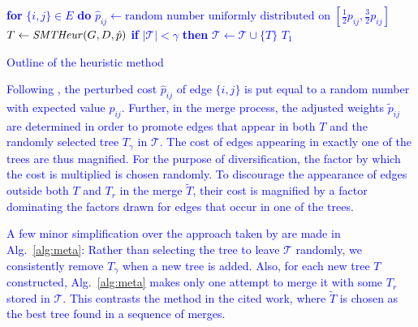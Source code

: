 \begin{algorithm}
\textcolor{blue}{
 {
  \textbf{for} $\{i,j\}\in E$ \textbf{do} $\hat{p}_{ij}\leftarrow\text{random number uniformly distributed on
  $\left[\frac{1}{2}p_{ij},\frac{3}{2}p_{ij}\right]$}$\;
  $T\leftarrow\text{\textit{SMTHeur}$(G,D,\hat{p})$}$\;
  \textbf{if} $|\mathcal{T}|<\gamma$ \textbf{then} $\mathcal{T}\leftarrow \mathcal{T}\cup \{T\}$\;
}
\Return $T_1$
}

\textcolor{blue}{
\caption{Outline of the heuristic method}
\label{alg:meta}
}
\end{algorithm}

\textcolor{blue}{
Following \citet{pajor18}, the perturbed cost $\hat{p}_{ij}$ of edge $\{i,j\}$ is put equal to a random number with expected value $p_{ij}$.
Further, in the merge process, the adjusted weights $\tilde{p}_{ij}$ are determined in order to 
promote edges that appear in both $T$ and the randomly selected tree $T_{\gamma}$ in $\mathcal{T}$. 
The cost of edges appearing in exactly one of the trees are thus magnified.
For the purpose of diversification, the factor by which the cost is multiplied is chosen randomly.
To discourage the appearance of edges outside both $T$ and $T_r$ in the merge $\tilde{T}$,
their cost is magnified by a factor dominating the factors drawn for edges that occur in one of the trees.
}

\textcolor{blue}{
A few minor simplification over the approach taken by \citet{pajor18} are made in Alg.\ \ref{alg:meta}:
Rather than selecting the tree to leave $\mathcal{T}$ randomly, we consistently remove $T_{\gamma}$ when a new tree is added.
Also, for each new tree $T$ constructed, Alg.\ \ref{alg:meta} makes only one attempt to merge it with some $T_r$ stored in $\mathcal{T}$.
This contrasts the method in the cited work, where $\tilde{T}$ is chosen as the best tree found in a sequence of merges.
}
